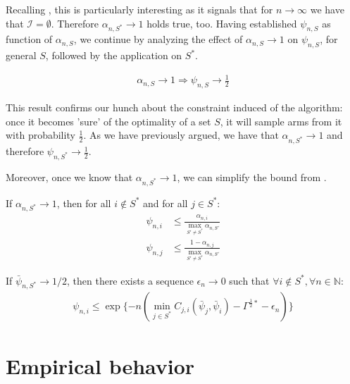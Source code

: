Recalling , this is particularly interesting as it signals that for $n \rightarrow \infty$ we have that $\mathcal{I} = \emptyset$. Therefore $\alpha_{n, S^*} \rightarrow 1$ holds true, too.
Having established $\psi_{n, S}$ as function of $\alpha_{n, S}$, we continue by analyzing the effect of $\alpha_{n, S} \rightarrow 1$ on $\psi_{n, S}$, for general $S$, followed by the application on $S^*$.
\begin{lemma}\label{lemma:psi_convergence}
  \begin{align}
    \alpha_{n, S} \rightarrow 1 \Rightarrow \psi_{n, S} \rightarrow \frac{1}{2}
  \end{align}
\end{lemma}
This result confirms our hunch about the constraint induced of the algorithm:
once it becomes 'sure' of the optimality of a set $S$, it will sample arms from
it with probability $\frac{1}{2}$. As we have previously argued, we have that
$\alpha_{n, S^*} \rightarrow 1$ and therefore $\psi_{n, S^*} \rightarrow
\frac{1}{2}$.

Moreover, once we know that $\alpha_{n, S^*} \rightarrow 1$, we can simplify the
bound from .
\begin{lemma}\label{lemma:measurement_plan_bound_max}
  If $\alpha_{n, S^*} \rightarrow 1$, then for all $i \notin S^*$ and for all
  $j \in S^*$:
  \begin{align}
    \psi_{n, i} &\leq \frac{\alpha_{n, i}}{\max_{S' \neq S^*} \alpha_{n, S'}} \\
    \psi_{n, j} &\leq \frac{1 - \alpha_{n, j}}{\max_{S' \neq S^*} \alpha_{n,
        S'}}
  \end{align}
\end{lemma}

\begin{lemma}\label{lemma:fraction_bound}
  If $\bar{\psi}_{n, S^*} \rightarrow 1/2$, then there exists a sequence
  $\epsilon_n \rightarrow 0$ such that $\forall i \notin S^*, \forall n \in
  \mathbb{N}$:
  \begin{align}
    \psi_{n, i} \leq \exp\{-n( \min_{j \in S^*} C_{j, i}(\bar{\psi}_j,
        \bar{\psi}_i) - \Gamma^{\frac{1}{2}*} - \epsilon_n) \}
  \end{align}
\end{lemma}

\section{Empirical behavior}\label{section:empirical_behavior}

